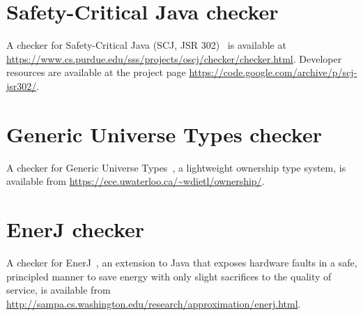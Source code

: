 




\section{Safety-Critical Java checker\label{safety-critical-java-checker}}

A checker for Safety-Critical Java (SCJ, JSR 302)~\cite{TangPJ2010} is available at
\url{https://www.cs.purdue.edu/sss/projects/oscj/checker/checker.html}.
Developer resources are available at the project page
\url{https://code.google.com/archive/p/scj-jsr302/}.







\section{Generic Universe Types checker\label{gut-checker}}

A checker for Generic Universe Types~\cite{DietlEM2011}, a lightweight ownership type
system, is available from
\url{https://ece.uwaterloo.ca/~wdietl/ownership/}.


\section{EnerJ checker\label{enerj-checker}}

A checker for EnerJ~\cite{SampsonDFGCG2011}, an extension to Java that exposes hardware faults
in a safe, principled manner to save energy with only
slight sacrifices to the quality of service, is available from
\url{http://sampa.cs.washington.edu/research/approximation/enerj.html}.


